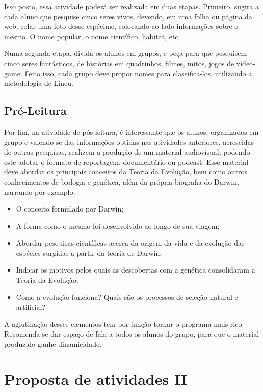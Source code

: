 \documentclass[12pt]{extarticle}
\begin{document}
Isso posto, essa atividade poderá ser realizada em duas etapas.
Primeiro, sugira a cada aluno que pesquise cinco seres vivos, devendo,
em uma folha ou página da web, colar uma foto desse espécime, colocando
ao lado informações sobre o mesmo. O nome popular, o nome científico,
habitat, etc.

Numa segunda etapa, divida os alunos em grupos, e peça para que
pesquisem cinco seres fantásticos, de histórias em quadrinhos, filmes,
mitos, jogos de vídeo-game. Feito isso, cada grupo deve propor nomes
para classifica-los, utilizando a metodologia de Lineu.

\subsection{Pré-Leitura}

Por fim, na atividade de pós-leitura, é interessante que os
alunos, organizados em grupo e valendo-se das informações obtidas nas
atividades anteriores, acrescidas de outras pesquisas, realizem a
produção de um material audiovisual, podendo este adotar o formato de
reportagem, documentário ou podcast. Esse material deve abordar os
principais conceitos da Teoria da Evolução, bem como outros
conhecimentos de biologia e genética, além da própria biografia do
Darwin, narrando por exemplo:

\begin{itemize}
\item
  O conceito formulado por Darwin;
\item
  A forma como o mesmo foi desenvolvido ao longo de sua viagem;
\item
  Abordar pesquisas científicas acerca da origem da vida e da evolução
  das espécies surgidas a partir da teoria de Darwin;
\item
  Indicar os motivos pelos quais as descobertas com a genética
  consolidaram a Teoria da Evolução;
\item
  Como a evolução funciona? Quais são os processos de seleção natural e
  artificial?
\end{itemize}

A aglutinação desses elementos tem por função tornar o programa mais
rico. Recomenda-se dar espaço de fala a todos os alunos do grupo, para
que o material produzido ganhe dinamicidade.

\section{Proposta de atividades II}
\end{document}
